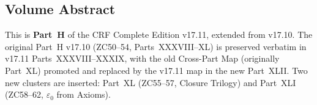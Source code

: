\documentclass[11pt, a4paper]{article}
\begin{document}
\subsection*{Volume Abstract}

\begin{volumebox}[title={Part H --- CRF Complete Edition v17.11
  (Parts XXXVIII--XLII, extended)}]
\sloppy
This is \textbf{Part~H} of the CRF Complete Edition v17.11, extended
from v17.10. The original Part~H v17.10 (ZC50--54, Parts~XXXVIII--XL)
is preserved verbatim in v17.11 Parts~XXXVIII--XXXIX, with the old
Cross-Part Map (originally Part~XL) promoted and replaced by the
v17.11 map in the new Part~XLII. Two new clusters are inserted:
Part~XL (ZC55--57, Closure Trilogy) and Part~XLI (ZC58--62,
$\varepsilon_0$ from Axioms).


\end{volumebox}
\end{document}
